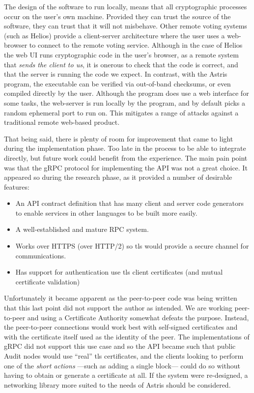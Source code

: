 The design of the software to run locally, means that all cryptographic processes occur on the user's own machine. Provided they can trust the source of the software, they can trust that it will not misbehave. Other remote voting systems (such as Helios) provide a client-server architecture where the user uses a web-browser to connect to the remote voting service. Although in the case of Helios the web UI runs cryptographic code in the user's browser, as a remote system that \emph{sends the client to us}, it is onerous to check that the code is correct, and that the server is running the code we expect. In contrast, with the Astris program, the executable can be verified via out-of-band checksums, or even compiled directly by the user. Although the program does use a web interface for some tasks, the web-server is run locally by the program, and by default picks a random ephemeral port to run on. This mitigates a range of attacks against a traditional remote web-based product.

That being said, there is plenty of room for improvement that came to light during the implementation phase. Too late in the process to be able to integrate directly, but future work could benefit from the experience. The main pain point was that the gRPC protocol for implementing the API was not a great choice. It appeared so during the research phase, as it provided a number of desirable features:

\begin{itemize}
    \item An API contract definition that has many client and server code generators to enable services in other languages to be built more easily.
    \item A well-established and mature RPC system.
    \item Works over HTTPS (over HTTP/2) so \gls{tls} would provide a secure channel for communications.
    \item Has support for authentication use \gls{tls} client certificates (and mutual certificate validation)
\end{itemize}

Unfortunately it became apparent as the peer-to-peer code was being written that this last point did not support the author as intended. We are working peer-to-peer and using a Certificate Authority somewhat defeats the purpose. Instead, the peer-to-peer connections would work best with self-signed certificates and with the certificate itself used as the identity of the peer. The implementations of gRPC did not support this use case and so the API became such that public Audit nodes would use ``real'' \gls{tls} certificates, and the clients looking to perform one of the \emph{short actions} ---such as adding a single block--- could do so without having to obtain or generate a certificate at all. If the system were re-designed, a networking library more suited to the needs of Astris should be considered.

